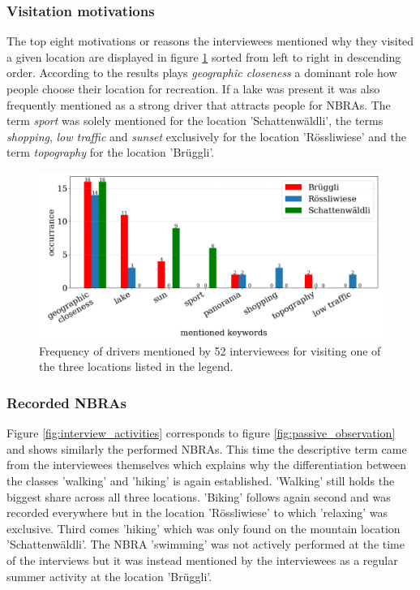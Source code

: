 \subsubsection{Visitation motivations}
The top eight motivations or reasons the interviewees mentioned why they visited a given location are displayed in figure \ref{fig:interview_visitation_motivation} sorted from left to right in descending order. According to the results plays \textit{geographic closeness} a dominant role how people choose their location for recreation. If a lake was present it was also frequently mentioned as a strong driver that attracts people for NBRAs. The term \textit{sport} was solely mentioned for the location 'Schattenw\"aldli', the terms \textit{shopping}, \textit{low traffic} and \textit{sunset} exclusively for the location 'R\"ossliwiese' and the term \textit{topography} for the location 'Br\"uggli'.

\begin{figure}[h!]
   \centering
   \includegraphics[width=\textwidth]{img/interview_keywords.pdf}
   \caption{Frequency of drivers mentioned by 52 interviewees for visiting one of the three locations listed in the legend.}
   \label{fig:interview_visitation_motivation}
\end{figure}

\subsubsection{Recorded NBRAs}
Figure \ref{fig:interview_activities} corresponds to figure \ref{fig:passive_observation} and shows similarly the performed NBRAs. This time the descriptive term came from the interviewees themselves which explains why the differentiation between the classes 'walking' and 'hiking' is again established. 'Walking' still holds the biggest share across all three locations. 'Biking' follows again second and was recorded everywhere but in the location 'R\"ossliwiese' to which 'relaxing' was exclusive. Third comes 'hiking' which was only found on the mountain location 'Schattenw\"aldli'. The NBRA 'swimming' was not actively performed at the time of the interviews but it was instead mentioned by the interviewees as a regular summer activity at the location 'Br\"uggli'.

